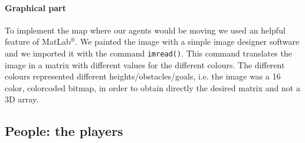 \documentclass[11pt]{article}
\begin{document}
\paragraph{Graphical part}


To implement the map where our agents would be moving we used an helpful feature of MatLab$^{®}$. We painted the image with a simple image designer software and we imported it with the command \verb#imread()#. This command translates the image in a matrix with different values for the different colours. The different colours represented different heights/obstacles/goals, i.e. the image was a 16 color, colorcoded bitmap, in order to obtain directly the desired matrix and not a 3D array.


\subsection{People: the players}
\end{document}

